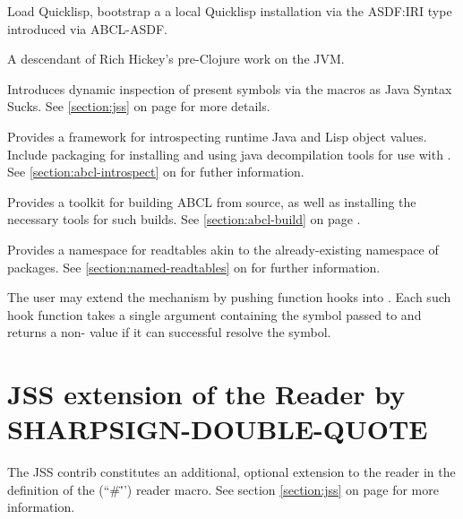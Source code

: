 \documentclass[10pt]{book}
\begin{document}
\begin{description}[style=nextline]
\begin{description}[style=nextline]
      \item[\code{quicklisp-abcl}] Load Quicklisp, bootstrap a a local
        Quicklisp installation via the ASDF:IRI type introduced via
        ABCL-ASDF.

      \item[\code{jfli}] A descendant of Rich Hickey's pre-Clojure work
        on the JVM.

      \item[\code{jss}] Introduces dynamic inspection of present
        symbols via the  macros as
        Java Syntax Sucks.  See \ref{section:jss} on page
        \pageref{sections:jss} for more details.

      \item[\code{abcl-introspect}] Provides a framework for
        introspecting runtime Java and Lisp object values.  Include
        packaging for installing and using java decompilation tools
        for use with .  See
        \ref{section:abcl-introspect} on
        \pageref{section:abcl-introspect} for futher information.
        
      \item[\code{abcl-build}] Provides a toolkit for building ABCL
        from source, as well as installing the necessary tools for
        such builds.  See \ref{section:abcl-build} on page
        \pageref{section:abcl-build}.

      \item[\code{named-readtables}] Provides a namespace for
        readtables akin to the already-existing namespace of packages.
        See \ref{section:named-readtables} on
        \pageref{section:named-readtables} for further information.

    \end{description}
\end{description}

The user may extend the  mechanism by pushing
function hooks into .  Each
such hook function takes a single argument containing the symbol
passed to  and returns a non- value if it
can successful resolve the symbol.

\section{JSS extension of the Reader by SHARPSIGN-DOUBLE-QUOTE}

The JSS contrib constitutes an additional, optional extension to the
reader in the definition of the 
(``\#\"'') reader macro.  See section \ref{section:jss} on page
\pageref{section:jss} for more information.
\end{document}
